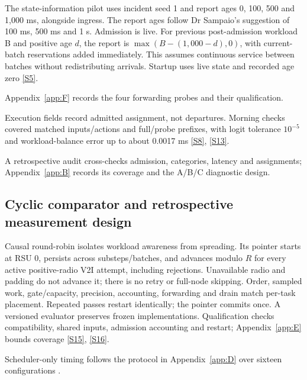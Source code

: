 \documentclass[12pt,a4paper]{article}
\begin{document}
The state-information pilot uses incident seed 1 and report ages 0, 100, 500 and 1,000 ms, alongside ingress. The report ages follow Dr Sampaio's suggestion of 100 ms, 500 ms and 1 s. Admission is live. For previous post-admission workload B and positive age $d$, the report is $\max(B-(1{,}000-d),0)$, with current-batch reservations added immediately. This assumes continuous service between batches without redistributing arrivals. Startup uses live state and recorded age zero \hyperref[source-s5]{[S5]}.

Appendix~\ref{app:F} records the four forwarding probes and their qualification.

Execution fields record admitted assignment, not departures. Morning checks covered matched inputs/actions and full/probe prefixes, with logit tolerance $10^{-5}$ and workload-balance error up to about 0.0017 ms \hyperref[source-s8]{[S8]}, \hyperref[source-s13]{[S13]}.

A retrospective audit cross-checks admission, categories, latency and assignments; Appendix~\ref{app:B} records its coverage and the A/B/C diagnostic design.

\FloatBarrier
\subsection{Cyclic comparator and retrospective measurement design}\label{sec:2.8}

Causal round-robin isolates workload awareness from spreading. Its pointer starts at RSU 0, persists across substeps/batches, and advances modulo $R$ for every active positive-radio V2I attempt, including rejections. Unavailable radio and padding do not advance it; there is no retry or full-node skipping. Order, sampled work, gate/capacity, precision, accounting, forwarding and drain match per-task placement. Repeated passes restart identically; the pointer commits once. A versioned evaluator preserves frozen implementations. Qualification checks compatibility, shared inputs, admission accounting and restart; Appendix~\ref{app:E} bounds coverage \hyperref[source-s15]{[S15]}, \hyperref[source-s16]{[S16]}.

Scheduler-only timing follows the protocol in Appendix~\ref{app:D} over sixteen configurations \cite{ref35}.
\end{document}

